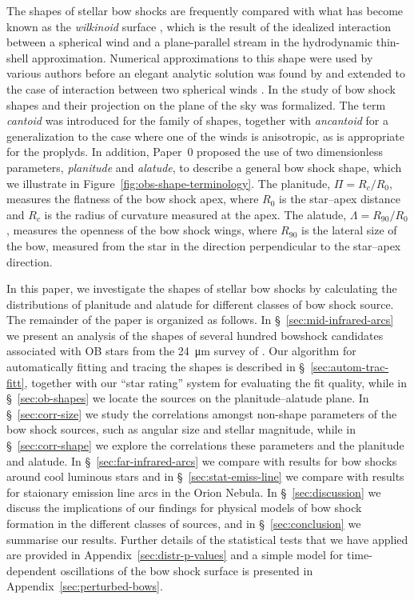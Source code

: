 The shapes of stellar bow shocks are frequently compared with what has
become known as the \textit{wilkinoid} surface \citep{Cox:2012a},
which is the result of the idealized interaction between a spherical
wind and a plane-parallel stream in the hydrodynamic thin-shell
approximation.  Numerical approximations to this shape were used by
various authors \citep{Baranov:1971a, Mac-Low:1991a} before an elegant
analytic solution was found by \citet{Wilkin:1996a} and extended to
the case of interaction between two spherical winds
\citep{Canto:1996}.  In \citet[hereafter, Paper~0]{Tarango-Yong:2018a}
the study of bow shock shapes and their projection on the plane of the
sky was formalized. The term \textit{cantoid} was introduced for the
\citet{Canto:1996} family of shapes, together with \textit{ancantoid}
for a generalization to the case where one of the winds is
anisotropic, as is appropriate for the proplyds.  In addition, Paper~0
proposed the use of two dimensionless parameters, \textit{planitude}
and \textit{alatude}, to describe a general bow shock shape, which we
illustrate in Figure~\ref{fig:obs-shape-terminology}.  The planitude,
\(\Pi = R_c / R_0\), measures the flatness of the bow shock apex, where
\(R_0\) is the star--apex distance and \(R_c\) is the radius of
curvature measured at the apex.  The alatude,
\(\Lambda = R_{90}/R_0\), measures the openness of the bow shock wings,
where \(R_{90}\) is the lateral size of the bow, measured from the
star in the direction perpendicular to the star--apex direction.

In this paper, we investigate the shapes of stellar bow shocks by
calculating the distributions of planitude and alatude for different
classes of bow shock source.  The remainder of the paper is organized
as follows. In \S~\ref{sec:mid-infrared-arcs} we present an analysis
of the shapes of several hundred bowshock candidates associated with
OB stars from the \SI{24}{\um} survey of \citet{Kobulnicky:2016a}.
Our algorithm for automatically fitting and tracing the shapes is
described in \S~\ref{sec:autom-trac-fitt}, together with our ``star
rating'' system for evaluating the fit quality, while in
\S~\ref{sec:ob-shapes} we locate the sources on the planitude--alatude
plane.  In \S~\ref{sec:corr-size} we study the correlations amongst
non-shape parameters of the bow shock sources, such as angular size
and stellar magnitude, while in \S~\ref{sec:corr-shape} we explore the
correlations these parameters and the planitude and alatude.  In
\S~\ref{sec:far-infrared-arcs} we compare with results for bow shocks
around cool luminous stars and in \S~\ref{sec:stat-emiss-line} we
compare with results for staionary emission line arcs in the Orion
Nebula.  In \S~\ref{sec:discussion} we discuss the implications of our
findings for physical models of bow shock formation in the different
classes of sources, and in \S~\ref{sec:conclusion} we summarise our
results.  Further details of the statistical tests that we have
applied are provided in Appendix~\ref{sec:distr-p-values} and a simple
model for time-dependent oscillations of the bow shock surface is
presented in Appendix~\ref{sec:perturbed-bows}.

